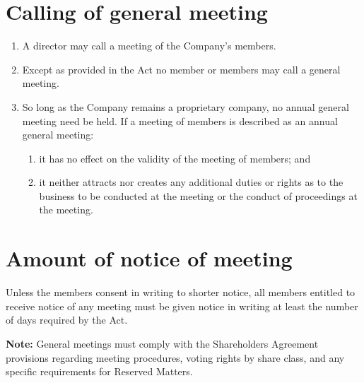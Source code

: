 \section{Calling of general meeting}

\begin{enumerate}[label=(\alph*)]
    \item A director may call a meeting of the Company's members.
    
    \item Except as provided in the Act no member or members may call a general meeting.
    
    \item So long as the Company remains a proprietary company, no annual general meeting need be held. If a meeting of members is described as an annual general meeting:
    \begin{enumerate}[label=(\roman*)]
        \item it has no effect on the validity of the meeting of members; and
        \item it neither attracts nor creates any additional duties or rights as to the business to be conducted at the meeting or the conduct of proceedings at the meeting.
    \end{enumerate}
\end{enumerate}

\section{Amount of notice of meeting}

Unless the members consent in writing to shorter notice, all members entitled to receive notice of any meeting must be given notice in writing at least the number of days required by the Act.

\textbf{Note:} General meetings must comply with the Shareholders Agreement provisions regarding meeting procedures, voting rights by share class, and any specific requirements for Reserved Matters. 
